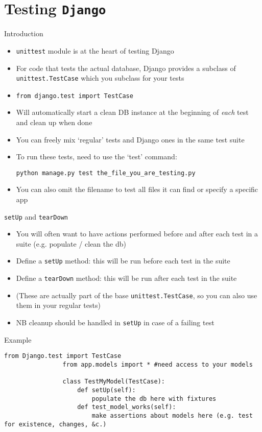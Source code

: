\documentclass[t]{beamer}
\newcommand{\code}[1]{\texttt{#1}}
\begin{document}
	\section{Testing \code{Django}}
	
	\begin{frame}{Introduction}
		\begin{itemize}
			\item \code{unittest} module is at the heart of testing Django
			\item For code that tests the actual database, Django provides a subclass of \code{unittest.TestCase} which you subclass for your tests
			\item \code{from django.test import TestCase}
			\item Will automatically start a clean DB instance at the beginning of \emph{each} test and clean up when done
			\item You can freely mix `regular' tests and Django ones in the same test suite
			\item To run these tests, need to use the `test' command:

				\code{python manage.py test the\_file\_you\_are\_testing.py}

			\item You can also omit the filename to test all files it can find or specify a specific app
		\end{itemize}
	\end{frame}

	\begin{frame}[fragile]{\code{setUp} and \code{tearDown}}
		\begin{itemize}
			\item You will often want to have actions performed before and after each test in a suite (e.g. populate / clean the db)
			\item Define a \code{setUp} method: this will be run before each test in the suite
			\item Define a \code{tearDown} method: this will be run after each test in the suite
			\item (These are actually part of the base \code{unittest.TestCase}, so you can also use them in your regular tests)
			\item NB cleanup should be handled in \code{setUp} in case of a failing test
		\end{itemize}
	\end{frame}

	\begin{frame}[fragile]{Example}
			\begin{lstlisting}[style=python, autogobble]
				from Django.test import TestCase
				from app.models import * #need access to your models

				class TestMyModel(TestCase):
					def setUp(self):
						populate the db here with fixtures
					def test_model_works(self):
						make assertions about models here (e.g. test for existence, changes, &c.)
			\end{lstlisting}
	\end{frame}
\end{document}
